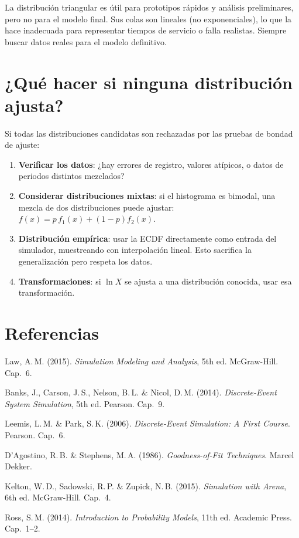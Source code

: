 \documentclass[11pt, letterpaper]{article}
\begin{document}
\begin{alertabox}
La distribución triangular es útil para prototipos rápidos y análisis preliminares, pero no para el modelo final. Sus colas son lineales (no exponenciales), lo que la hace inadecuada para representar tiempos de servicio o falla realistas. Siempre buscar datos reales para el modelo definitivo.
\end{alertabox}

\section{¿Qué hacer si ninguna distribución ajusta?}

Si todas las distribuciones candidatas son rechazadas por las pruebas de bondad de ajuste:

\begin{enumerate}
    \item \textbf{Verificar los datos}: ¿hay errores de registro, valores atípicos, o datos de periodos distintos mezclados?
    \item \textbf{Considerar distribuciones mixtas}: si el histograma es bimodal, una mezcla de dos distribuciones puede ajustar: $f(x) = p\,f_1(x) + (1-p)f_2(x)$.
    \item \textbf{Distribución empírica}: usar la ECDF directamente como entrada del simulador, muestreando con interpolación lineal. Esto sacrifica la generalización pero respeta los datos.
    \item \textbf{Transformaciones}: si $\ln X$ se ajusta a una distribución conocida, usar esa transformación.
\end{enumerate}

\section*{Referencias}

\begin{enumerate}[label={[\arabic*]}]
    \item Law, A.\,M. (2015). \textit{Simulation Modeling and Analysis}, 5th ed. McGraw-Hill. Cap.~6.
    \item Banks, J., Carson, J.\,S., Nelson, B.\,L. \& Nicol, D.\,M. (2014). \textit{Discrete-Event System Simulation}, 5th ed. Pearson. Cap.~9.
    \item Leemis, L.\,M. \& Park, S.\,K. (2006). \textit{Discrete-Event Simulation: A First Course}. Pearson. Cap.~6.
    \item D'Agostino, R.\,B. \& Stephens, M.\,A. (1986). \textit{Goodness-of-Fit Techniques}. Marcel Dekker.
    \item Kelton, W.\,D., Sadowski, R.\,P. \& Zupick, N.\,B. (2015). \textit{Simulation with Arena}, 6th ed. McGraw-Hill. Cap.~4.
    \item Ross, S.\,M. (2014). \textit{Introduction to Probability Models}, 11th ed. Academic Press. Cap.~1--2.
\end{enumerate}
\end{document}
